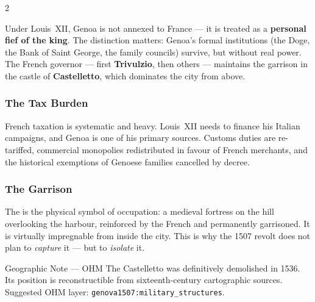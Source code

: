 
\begin{multicols}{2}

Under Louis~XII, Genoa is not annexed to France --- it is treated as
a \textbf{personal fief of the king}. The distinction matters: Genoa's
formal institutions (the Doge, the Bank of Saint George, the family
councils) survive, but without real power. The French governor ---
first \textbf{Trivulzio}, then others --- maintains the garrison in the
castle of \textbf{Castelletto}, which dominates the city from above.

\subsubsection{The Tax Burden}

French taxation is systematic and heavy. Louis~XII needs to finance his
Italian campaigns, and Genoa is one of his primary sources. Customs duties
are re-tariffed, commercial monopolies redistributed in favour of French
merchants, and the historical exemptions of Genoese families cancelled by
decree.

\columnbreak

\subsubsection{The Garrison}


The  is the physical symbol of occupation: a medieval
fortress on the hill overlooking the harbour, reinforced by the French and
permanently garrisoned. It is virtually impregnable from inside the city.
This is why the 1507 revolt does not plan to \textit{capture} it --- but
to \textit{isolate} it.

\begin{rulebox}[SharedBrown]{Geographic Note --- OHM}
The Castelletto was definitively demolished in 1536. Its position is
reconstructible from sixteenth-century cartographic sources.
Suggested OHM layer: \texttt{genova1507:military\_structures}.
\end{rulebox}

\end{multicols}


